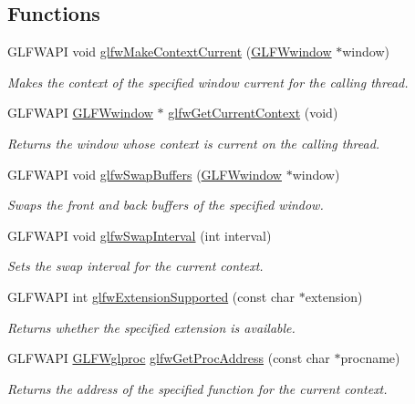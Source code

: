 \subsection*{\-Functions}
\begin{DoxyCompactItemize}
\item 
\-G\-L\-F\-W\-A\-P\-I void \hyperlink{group__context_gafd76c93e15ec8b0b90506a9936a46185}{glfw\-Make\-Context\-Current} (\hyperlink{group__window_ga3c96d80d363e67d13a41b5d1821f3242}{\-G\-L\-F\-Wwindow} $\ast$window)
\begin{DoxyCompactList}\small\item\em \-Makes the context of the specified window current for the calling thread. \end{DoxyCompactList}\item 
\-G\-L\-F\-W\-A\-P\-I \hyperlink{group__window_ga3c96d80d363e67d13a41b5d1821f3242}{\-G\-L\-F\-Wwindow} $\ast$ \hyperlink{group__context_gac28d98c655377d81a516bf5ef90780c8}{glfw\-Get\-Current\-Context} (void)
\begin{DoxyCompactList}\small\item\em \-Returns the window whose context is current on the calling thread. \end{DoxyCompactList}\item 
\-G\-L\-F\-W\-A\-P\-I void \hyperlink{group__context_gafb827800eedbfcbc97b1e5408df668d7}{glfw\-Swap\-Buffers} (\hyperlink{group__window_ga3c96d80d363e67d13a41b5d1821f3242}{\-G\-L\-F\-Wwindow} $\ast$window)
\begin{DoxyCompactList}\small\item\em \-Swaps the front and back buffers of the specified window. \end{DoxyCompactList}\item 
\-G\-L\-F\-W\-A\-P\-I void \hyperlink{group__context_ga12a595c06947cec4967c6e1f14210a8a}{glfw\-Swap\-Interval} (int interval)
\begin{DoxyCompactList}\small\item\em \-Sets the swap interval for the current context. \end{DoxyCompactList}\item 
\-G\-L\-F\-W\-A\-P\-I int \hyperlink{group__context_ga9a28c712d35f9e43534e1d03b051c04c}{glfw\-Extension\-Supported} (const char $\ast$extension)
\begin{DoxyCompactList}\small\item\em \-Returns whether the specified extension is available. \end{DoxyCompactList}\item 
\-G\-L\-F\-W\-A\-P\-I \hyperlink{group__context_gabf42b10edde1c4fc71e212e576b9f811}{\-G\-L\-F\-Wglproc} \hyperlink{group__context_ga0e8af175218929615c16e74938c10f2a}{glfw\-Get\-Proc\-Address} (const char $\ast$procname)
\begin{DoxyCompactList}\small\item\em \-Returns the address of the specified function for the current context. \end{DoxyCompactList}\end{DoxyCompactItemize}


